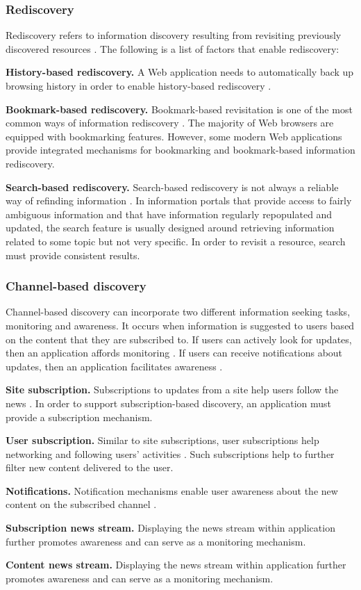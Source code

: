 \documentclass{casconpaper}
\begin{document}
{\subsubsection{Rediscovery}
Rediscovery refers to information discovery resulting from revisiting previously discovered resources \cite{tauscher}. The following is a list of factors that enable rediscovery:

\textbf{History-based rediscovery.} A Web application needs to automatically back up browsing history in order to enable history-based rediscovery \cite{tauscher}.   

\textbf{Bookmark-based rediscovery.} Bookmark-based revisitation is one of the most common ways of information rediscovery \cite{abrams}. The majority of Web browsers are equipped with bookmarking features. However, some modern Web applications provide integrated mechanisms for bookmarking and bookmark-based information rediscovery.

\textbf{Search-based rediscovery.} Search-based rediscovery is not always a reliable way of refinding information \cite{cockburn}. In information portals that provide access to fairly ambiguous information and that have information regularly repopulated and updated, the search feature is usually designed around retrieving information related to some topic but not very specific. In order to revisit a resource, search must provide consistent results.

} %

{\subsubsection{Channel-based discovery}
Channel-based discovery can incorporate two different information seeking tasks, monitoring and awareness. It occurs when information is suggested to users based on the content that they are subscribed to. If users can actively look for updates, then an application affords monitoring \cite{morrison}. If users can receive notifications about updates, then an application facilitates awareness \cite{bates2002, bates1986}.                            


\textbf{Site subscription.} Subscriptions to updates from a site help users follow the news \cite{java}. In order to support subscription-based discovery, an application must provide a subscription mechanism.

\textbf{User subscription.} Similar to site subscriptions, user subscriptions help networking and following users' activities \cite{millen}. Such subscriptions help to further filter new content delivered to the user.

\textbf{Notifications.} Notification mechanisms enable user awareness about the  new content on the subscribed channel \cite{millen}. 

\textbf{Subscription news stream.} Displaying the news stream within application further promotes awareness and can serve as a monitoring mechanism.

\textbf{Content news stream.} Displaying the news stream within application further promotes awareness and can serve as a monitoring mechanism.

} %
\end{document}
